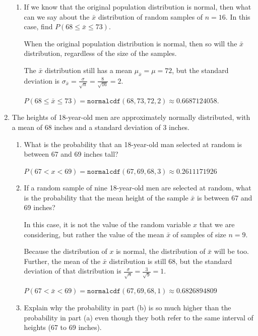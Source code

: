 \documentclass{article}
\newcommand{\answer}[1]{\color{white}#1}
\begin{document}
\begin{enumerate}
\begin{enumerate}
	\item If we know that the original population distribution is normal, then what can we say about the $\bar x$ distribution of random samples of $n=16$.  In this case, find $P(68 \leq \bar x \leq 73)$. 
	
	{\answer When the original population distribution is normal, then so will the $\bar{x}$ distribution, regardless of the size of the samples. 
	
	The $\bar{x}$ distribution still has a mean $\mu_{\bar{x}} = \mu = 72$, but the standard deviation is $\sigma_{\bar{x}} = \frac{\sigma}{\sqrt{n}} =\frac{8}{\sqrt{16}} = 2$. 
	
	$P(68 \leq \bar{x} \leq 73) = \texttt{normalcdf}(68, 73, 72, 2) \approx 0.6687124058$.
	} 
	
	\end{enumerate}
	
\item The heights of 18-year-old men are approximately normally distributed, with a mean of 68 inches and a standard deviation of 3 inches.

	\begin{enumerate}
	
	\item What is the probability that an 18-year-old man selected at random is between 67 and 69 inches tall? 
	
	{\answer $P(67 < x < 69) = \texttt{normalcdf}(67, 69, 68, 3) \approx 0.2611171926$
	} 

	\item If a random sample of nine 18-year-old men are selected at random, what is the probability that the mean height of the sample $\bar x$ is between 67 and 69 inches? 
	
	{\answer  In this case, it is not the value of the random variable $x$ that we are considering, but rather the value of the mean $\bar{x}$ of samples of size $n = 9$.  
	
	Because the distribution of $x$ is normal, the distribution of $\bar{x}$ will be too.  Further, the mean of the $\bar{x}$ distribution is still 68, but the standard deviation of that distribution is $\frac{\sigma}{\sqrt{n}} = \frac{3}{\sqrt{9}} = 1$. 
	
	$P(67 < \bar{x} < 69) = \texttt{normalcdf}(67, 69, 68, 1) \approx 0.6826894809$
	} 

	\item Explain why the probability in part (b) is so much higher than the probability in part (a) even though they both refer to the same interval of heights (67 to 69 inches). 
	

\end{enumerate}
\end{enumerate}
\end{document}
